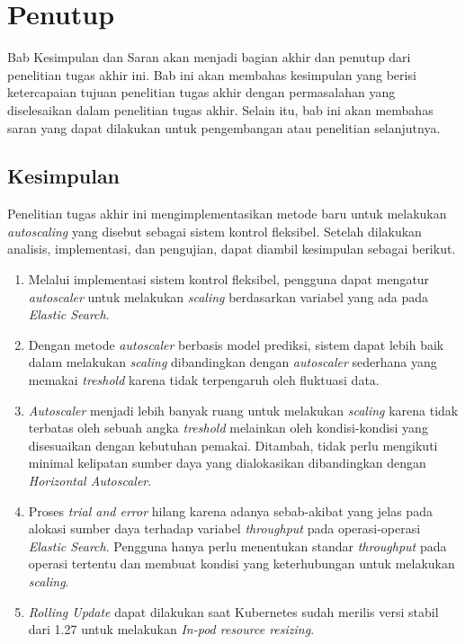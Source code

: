 \chapter{Penutup}

Bab Kesimpulan dan Saran akan menjadi bagian akhir dan penutup dari penelitian tugas akhir ini. Bab ini akan membahas kesimpulan yang berisi ketercapaian tujuan penelitian tugas akhir dengan permasalahan yang diselesaikan dalam penelitian tugas akhir. Selain itu, bab ini akan membahas saran yang dapat dilakukan untuk pengembangan atau penelitian selanjutnya.

\section{Kesimpulan}
Penelitian tugas akhir ini mengimplementasikan metode baru untuk melakukan \textit{autoscaling} yang disebut sebagai sistem kontrol fleksibel. Setelah dilakukan analisis, implementasi, dan pengujian, dapat diambil kesimpulan sebagai berikut.
\begin{enumerate}
    \item Melalui implementasi sistem kontrol fleksibel, pengguna dapat mengatur \textit{autoscaler} untuk melakukan \textit{scaling} berdasarkan variabel yang ada pada \textit{Elastic Search}.
    \item Dengan metode \textit{autoscaler} berbasis model prediksi, sistem dapat lebih baik dalam melakukan \textit{scaling} dibandingkan dengan \textit{autoscaler} sederhana yang memakai \textit{treshold} karena tidak terpengaruh oleh fluktuasi data.
    \item \textit{Autoscaler} menjadi lebih banyak ruang untuk melakukan \textit{scaling} karena tidak terbatas oleh sebuah angka \textit{treshold} melainkan oleh kondisi-kondisi yang disesuaikan dengan kebutuhan pemakai. Ditambah, tidak perlu mengikuti minimal kelipatan sumber daya yang dialokasikan dibandingkan dengan \textit{Horizontal Autoscaler}.
    \item Proses \textit{trial and error} hilang karena adanya sebab-akibat yang jelas pada alokasi sumber daya terhadap variabel \textit{throughput} pada operasi-operasi \textit{Elastic Search}. Pengguna hanya perlu menentukan standar \textit{throughput} pada operasi tertentu dan membuat kondisi yang keterhubungan untuk melakukan \textit{scaling}.
    \item \textit{Rolling Update} dapat dilakukan saat Kubernetes sudah merilis versi stabil dari 1.27 untuk melakukan \textit{In-pod resource resizing}.
\end{enumerate}

